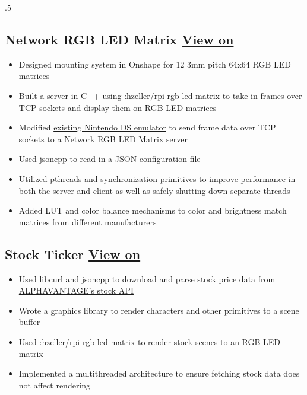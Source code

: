 \documentclass{article}
\begin{document}
\begin{spacing}{.5}
{	\subsection{Network RGB LED Matrix \hspace{.1cm} \href{https://github.com/ZachWWalden/rpi-rgb-matrix-sink-server}{View on \faGithub} \hfill {}}
		\begin{itemize}[label=--,itemsep=-.35ex]
			\item \large{Designed mounting system in Onshape for 12 3mm pitch 64x64 RGB LED matrices}
			\item \large{Built a server in C++ using \href{https://www.github.com/hzeller/rpi-rgb-led-matrix}{\faGithub:hzeller/rpi-rgb-led-matrix} to take in frames over TCP sockets and display them on RGB LED matrices}
			\item \large{Modified \href{https://www.github.com/ZachWWalden/desmume-matrix}{\faGithub \large{ }existing Nintendo DS emulator} to send frame data over TCP sockets to a Network RGB LED Matrix server}
			\item \large{Used jsoncpp to read in a JSON configuration file}
			\item \large{Utilized pthreads and synchronization primitives to improve performance in both the server and client as well as safely shutting down separate threads}
			\item \large{Added LUT and color balance mechanisms to color and brightness match matrices from different manufacturers}
		\end{itemize}
	\subsection{Stock Ticker \hspace{.1cm} \href{https://github.com/ZachWWalden/stock-info}{View on \faGithub} \hfill {}}
		\begin{itemize}[label=--,itemsep=-.35ex]
			\item \large{Used libcurl and jsoncpp to download and parse stock price data from \href{https://www.alphavantage.co}{ALPHAVANTAGE's stock API}}
			\item \large{Wrote a graphics library to render characters and other primitives to a scene buffer}
			\item \large{Used \href{https://www.github.com/hzeller/rpi-rgb-led-matrix}{\faGithub:hzeller/rpi-rgb-led-matrix} to render stock scenes to an RGB LED matrix}
			\item \large{Implemented a multithreaded architecture to ensure fetching stock data does not affect rendering}
		\end{itemize}
}
\end{spacing}
\end{document}
